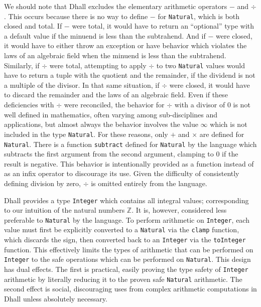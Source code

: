 \documentclass[12pt]{diazessay}
\newcommand{\Nat    }{\texttt{Natural}}
\newcommand{\Integer}{\texttt{Integer}}
\begin{document}
We should note that Dhall excludes the elementary arithmetic operators $-$ and $\div$.
This occurs because there is no way to define $-$ for \Nat{}, which is both closed and total.
If $-$ were total, it would have to return an ``optional'' type with a default value if the minuend is less than the subtrahend.
And if $-$ were closed, it would have to either throw an exception or have behavior which violates the laws of an algebraic field when the minuend is less than the subtrahend.
Similarly, if $\div$ were total, attempting to apply $\div$ to two \Nat{} values would have to return a tuple with the quotient and the remainder, if the dividend is not a multiple of the divisor.
In that same situation, if $\div$ were closed, it would have to discard the remainder and the laws of an algebraic field.
Even if these deficiencies with $\div$ were reconciled, the behavior for $\div$ with a divisor of $0$ is not well defined in mathematics, often varying among sub-disciplines and applications, but almost always the behavior involves the value $\infty$ which is not included in the type \Nat{}.
For these reasons, only $+$ and $\times$ are defined for \Nat{}.
There is a function \texttt{subtract} defined for \Nat{} by the language which subtracts the first argument from the second argument, clamping to $0$ if the result is negative.
This behavior is intentionally provided as a function instead of as an infix operator to discourage its use.
Given the difficulty of consistently defining division by zero, $\div$ is omitted entirely from the language.

Dhall provides a type \Integer{} which contains all integral values; corresponding to our intuition of the natural numbers $\mathbb{Z}$.
It is, however, considered less preferable to \Nat{} by the language.
To perform arithmetic on \Integer{}, each value must first be explicitly converted to a \Nat{} via the \texttt{clamp} function, which discards the sign, then converted back to an \Integer{} via the \texttt{toInteger} function.
This effectively limits the types of arithmetic that can be performed on \Integer{} to the safe operations which can be performed on \Nat{}.
This design has dual effects.
The first is practical, easily proving the type safety of \Integer{} arithmetic by literally reducing it to the proven safe \Nat{} arithmetic.
The second effect is social, discouraging uses from complex arithmetic computations in Dhall unless absolutely necessary.
\end{document}
